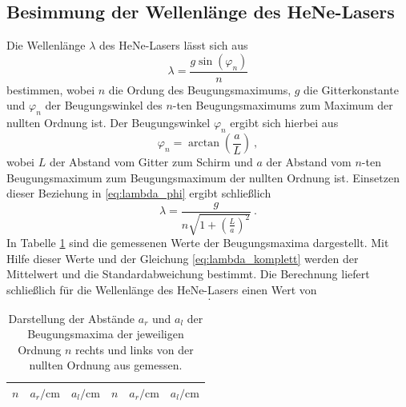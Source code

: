 \clearpage
\subsection{Besimmung der Wellenlänge des HeNe-Lasers}
\label{sec:Gitter}

Die Wellenlänge $\lambda$ des HeNe-Lasers lässt sich aus
%
\begin{equation}
	\lambda = \frac{g \sin(\varphi_n)}{n}
	\label{eq:lambda_phi}
\end{equation}
%
bestimmen, wobei $n$ die Ordung des Beugungsmaximums, $g$ die Gitterkonstante
und $\varphi_n$ der Beugungswinkel des $n$-ten Beugungsmaximums zum Maximum der
nullten Ordnung ist.
Der Beugungswinkel $\varphi_n$ ergibt sich hierbei aus
%
\begin{equation}
	\varphi_n = \arctan(\frac{a}{L}) ~,
	\label{eq:Winkelbeziehung}
\end{equation}
%
wobei $L$ der Abstand vom Gitter zum Schirm und $a$ der Abstand vom
$n$-ten Beugungsmaximum zum Beugungsmaximum der nullten Ordnung ist.
Einsetzen dieser Beziehung in \eqref{eq:lambda_phi} ergibt schließlich
%
\begin{equation}
		\lambda = \frac{g}{n \sqrt{1 + \left(\frac{L}{a}\right)^2}} ~.
		\label{eq:lambda_komplett}
\end{equation}
%
In Tabelle \ref{tab:G} sind die gemessenen Werte der Beugungsmaxima
dargestellt. Mit Hilfe dieser Werte und der Gleichung
\eqref{eq:lambda_komplett} werden der Mittelwert und die Standardabweichung
bestimmt.
Die Berechnung liefert schließlich für die Wellenlänge des HeNe-Lasers einen
Wert von
%
\begin{equation}
	 ~.
	\label{eq:l_ergebnis}
\end{equation}
%
\begin{table}[hb]
	\centering
	\begin{tabular}{ccc|ccc}
		\midrule
		\midrule
		$n$ & $a_r/\si{\cm}$ & $a_l/\si{\cm}$ &
		$n$ & $a_r/\si{\cm}$ & $a_l/\si{\cm}$ \\
		\midrule
		
		\midrule
		\midrule
	\end{tabular}
	\caption{Darstellung der Abstände $a_r$ und $a_l$ der Beugungsmaxima der
		jeweiligen Ordnung $n$ rechts
		und links von der nullten Ordnung aus gemessen.}
	\label{tab:G}
\end{table}

